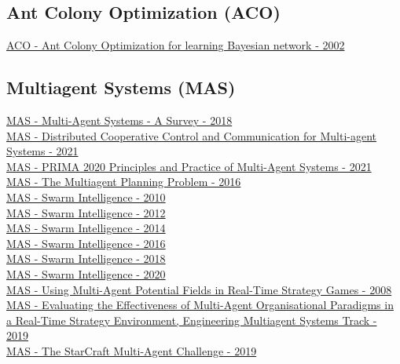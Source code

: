 \subsection{Ant Colony Optimization (ACO)}
\href{https://www.sciencedirect.com/science/article/pii/S0888613X02000919}{ACO - Ant Colony Optimization for learning Bayesian network - 2002}

\subsection{Multiagent Systems (MAS)}
\href{https://ieeexplore.ieee.org/abstract/document/8352646}{MAS - Multi-Agent Systems - A Survey - 2018}
\\
\href{https://link.springer.com/book/10.1007%2F978-981-33-6718-0}{MAS - Distributed Cooperative Control and Communication for Multi-agent Systems - 2021}
\\
\href{https://link.springer.com/book/10.1007%2F978-3-030-69322-0}{MAS - PRIMA 2020 Principles and Practice of Multi-Agent Systems - 2021}
\\
\href{https://www.hindawi.com/journals/complexity/2017/3813912/}{MAS - The Multiagent Planning Problem - 2016}
\\
\href{https://link.springer.com/book/10.1007/978-3-642-15461-4}{MAS - Swarm Intelligence - 2010}
\\
\href{https://link.springer.com/book/10.1007/978-3-642-32650-9}{MAS - Swarm Intelligence - 2012}
\\
\href{https://link.springer.com/book/10.1007/978-3-319-09952-1}{MAS - Swarm Intelligence - 2014}
\\
\href{https://link.springer.com/book/10.1007/978-3-319-44427-7}{MAS - Swarm Intelligence - 2016}
\\
\href{https://link.springer.com/book/10.1007/978-3-030-00533-7}{MAS - Swarm Intelligence - 2018}
\\
\href{https://link.springer.com/book/10.1007/978-3-030-60376-2}{MAS - Swarm Intelligence - 2020}
\\
\href{https://www.diva-portal.org/smash/record.jsf?pid=diva2%3A805249&dswid=2610}{MAS - Using Multi-Agent Potential Fields in Real-Time Strategy Games - 2008}
\\
\href{https://dl.acm.org/doi/abs/10.5555/3306127.3331766}{MAS - Evaluating the Effectiveness of Multi-Agent Organisational Paradigms in a Real-Time Strategy Environment, Engineering Multiagent Systems Track - 2019}
\\
\href{https://dl.acm.org/doi/10.5555/3306127.3332052}{MAS - The StarCraft Multi-Agent Challenge - 2019}
